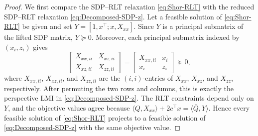 \documentclass[10pt,a4paper]{amsart}
\def\bQ{\overline{Q}}
\begin{document}
\begin{proof}\;
We first compare the SDP--RLT relaxation \eqref{eq:Shor-RLT} with the reduced SDP--RLT relaxation \eqref{eq:Decomposed-SDP-z}. Let a feasible solution of \eqref{eq:Shor-RLT} be given and set $Y=[1, x^\top; x, X_{xx}]$.
Since $Y$ is a principal submatrix of the lifted SDP matrix, $Y\succeq0$. Moreover, each principal submatrix indexed by $(x_i,z_i)$ gives
\[
\begin{bmatrix}
X_{xx,ii}&X_{xz,ii}\\
X_{xz,ii}&X_{zz,ii}
\end{bmatrix}
=
\begin{bmatrix}
X_{xx,ii}&x_i\\
x_i&z_i
\end{bmatrix}
\succeq0,
\]
where $X_{xx,ii}$, $X_{xz,ii}$, and $X_{zz,ii}$ are the $(i,i)$-entries of $X_{xx}$, $X_{xz}$, and $X_{zz}$, respectively.
After permuting the two rows and columns, this is exactly the perspective LMI in \eqref{eq:Decomposed-SDP-z}. The RLT constraints depend only on $Y$, and the objective values agree because $\langle Q,X_{xx}\rangle+2c^\top x=\langle \bQ,Y\rangle$.
Hence every feasible solution of \eqref{eq:Shor-RLT} projects to a feasible solution of \eqref{eq:Decomposed-SDP-z} with the same objective value.


\end{proof}
\end{document}
